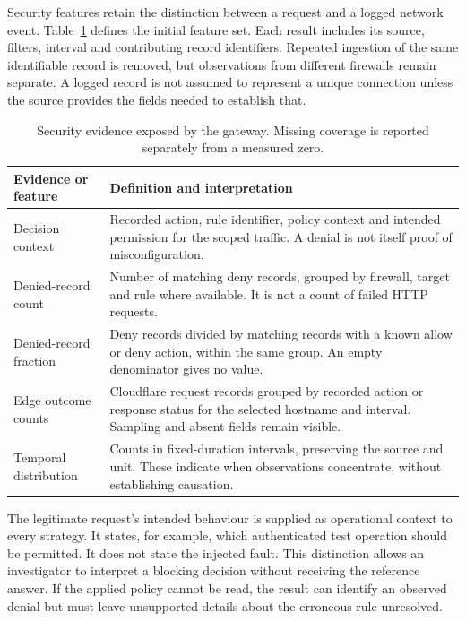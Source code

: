 Security features retain the distinction between a request and a logged
network event. Table~\ref{tab:design:features} defines the initial feature
set. Each result includes its source, filters, interval and contributing
record identifiers. Repeated ingestion of the same identifiable record
is removed, but observations from different firewalls remain separate.
A logged record is not assumed to represent a unique connection unless
the source provides the fields needed to establish that.

\begin{table}[htbp]
\centering\small
\caption{Security evidence exposed by the gateway. Missing coverage is
reported separately from a measured zero.}
\label{tab:design:features}
\begin{tabularx}{\textwidth}{@{}>{\raggedright\arraybackslash}p{}>{\raggedright\arraybackslash}X@{}}
\toprule
Evidence or feature & Definition and interpretation \\
\midrule
Decision context & Recorded action, rule identifier, policy context and intended permission for the scoped traffic. A denial is not itself proof of misconfiguration. \\
\addlinespace
Denied-record count & Number of matching deny records, grouped by firewall, target and rule where available. It is not a count of failed HTTP requests. \\
\addlinespace
Denied-record fraction & Deny records divided by matching records with a known allow or deny action, within the same group. An empty denominator gives no value. \\
\addlinespace
Edge outcome counts & Cloudflare request records grouped by recorded action or response status for the selected hostname and interval. Sampling and absent fields remain visible. \\
\addlinespace
Temporal distribution & Counts in fixed-duration intervals, preserving the source and unit. These indicate when observations concentrate, without establishing causation. \\
\bottomrule
\end{tabularx}
\end{table}

The legitimate request's intended behaviour is supplied as operational
context to every strategy. It states, for example, which authenticated
test operation should be permitted. It does not state the injected fault.
This distinction allows an investigator to interpret a blocking decision
without receiving the reference answer. If the applied policy cannot be
read, the result can identify an observed denial but must leave unsupported
details about the erroneous rule unresolved.

